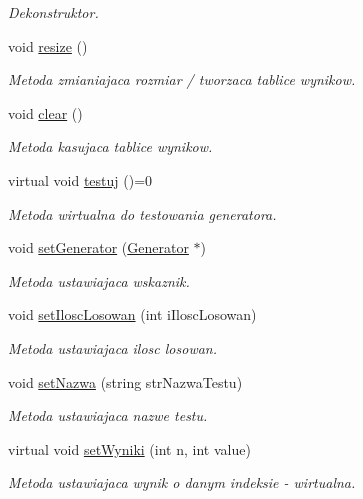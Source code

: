 \begin{DoxyCompactItemize}
\begin{DoxyCompactList}\small\item\em Dekonstruktor. \end{DoxyCompactList}\item 
void \hyperlink{classTest_a9e1d30aac3228c9bd71b8d1035f84b18}{resize} ()
\begin{DoxyCompactList}\small\item\em Metoda zmianiajaca rozmiar / tworzaca tablice wynikow. \end{DoxyCompactList}\item 
void \hyperlink{classTest_a25872f3ab197f8be59463b3e3bf98a42}{clear} ()
\begin{DoxyCompactList}\small\item\em Metoda kasujaca tablice wynikow. \end{DoxyCompactList}\item 
virtual void \hyperlink{classTest_a3c91567feb37106c314c03b9cceb3527}{testuj} ()=0
\begin{DoxyCompactList}\small\item\em Metoda wirtualna do testowania generatora. \end{DoxyCompactList}\item 
void \hyperlink{classTest_adab32b84de0a057a71f6a3fe14ed16bd}{set\+Generator} (\hyperlink{classGenerator}{Generator} $\ast$)
\begin{DoxyCompactList}\small\item\em Metoda ustawiajaca wskaznik. \end{DoxyCompactList}\item 
void \hyperlink{classTest_af3ef37c59875a1d95d6ba65e66fdce4b}{set\+Ilosc\+Losowan} (int i\+Ilosc\+Losowan)
\begin{DoxyCompactList}\small\item\em Metoda ustawiajaca ilosc losowan. \end{DoxyCompactList}\item 
void \hyperlink{classTest_a20b10cc4940235337f3e1a5189aef625}{set\+Nazwa} (string str\+Nazwa\+Testu)
\begin{DoxyCompactList}\small\item\em Metoda ustawiajaca nazwe testu. \end{DoxyCompactList}\item 
virtual void \hyperlink{classTest_a913ca9be6a22e4f559d4864f65f418b9}{set\+Wyniki} (int n, int value)
\begin{DoxyCompactList}\small\item\em Metoda ustawiajaca wynik o danym indeksie -\/ wirtualna. \end{DoxyCompactList}\item 

\end{DoxyCompactItemize}
